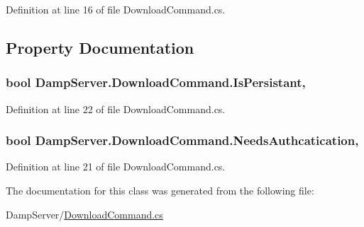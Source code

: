 Definition at line 16 of file Download\-Command.\-cs.



\subsection{Property Documentation}
\hypertarget{class_damp_server_1_1_download_command_a84c82881878f6608fc18dbdf334d5d38}{
\subsubsection[{Is\-Persistant}]{\setlength{\rightskip}{0pt plus 5cm}bool Damp\-Server.\-Download\-Command.\-Is\-Persistant\hspace{0.3cm}{\ttfamily [get]}, {\ttfamily [set]}}}\label{class_damp_server_1_1_download_command_a84c82881878f6608fc18dbdf334d5d38}


Definition at line 22 of file Download\-Command.\-cs.

\hypertarget{class_damp_server_1_1_download_command_a7eeac316a894ce7c03f3d9c73a4e4e4f}{
\subsubsection[{Needs\-Authcatication}]{\setlength{\rightskip}{0pt plus 5cm}bool Damp\-Server.\-Download\-Command.\-Needs\-Authcatication\hspace{0.3cm}{\ttfamily [get]}, {\ttfamily [set]}}}\label{class_damp_server_1_1_download_command_a7eeac316a894ce7c03f3d9c73a4e4e4f}


Definition at line 21 of file Download\-Command.\-cs.



The documentation for this class was generated from the following file\-:\begin{DoxyCompactItemize}
\item 
Damp\-Server/\hyperlink{_download_command_8cs}{Download\-Command.\-cs}\end{DoxyCompactItemize}
